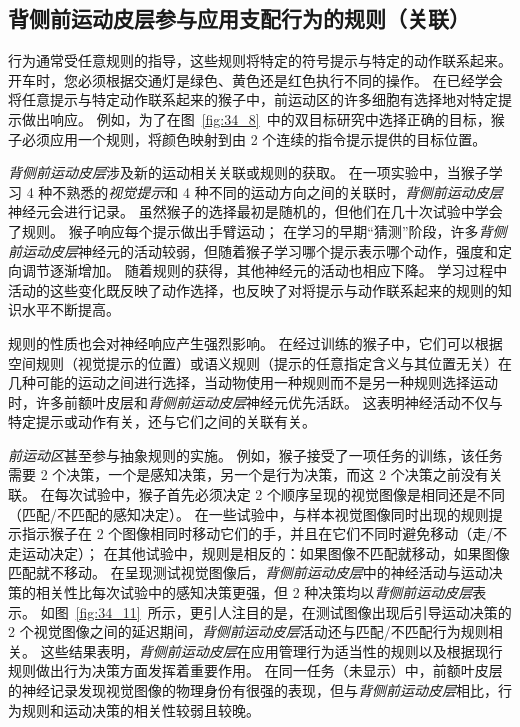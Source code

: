 \subsection{背侧前运动皮层参与应用支配行为的规则（关联）}

行为通常受任意规则的指导，这些规则将特定的符号提示与特定的动作联系起来。
开车时，您必须根据交通灯是绿色、黄色还是红色执行不同的操作。
在已经学会将任意提示与特定动作联系起来的猴子中，前运动区的许多细胞有选择地对特定提示做出响应。
例如，为了在图~\ref{fig:34_8}~中的双目标研究中选择正确的目标，猴子必须应用一个规则，将颜色映射到由 2 个连续的指令提示提供的目标位置。


\textit{背侧前运动皮层}涉及新的运动相关关联或规则的获取。
在一项实验中，当猴子学习 4 种不熟悉的\textit{视觉提示}和 4 种不同的运动方向之间的关联时，\textit{背侧前运动皮层}神经元会进行记录。
虽然猴子的选择最初是随机的，但他们在几十次试验中学会了规则。
猴子响应每个提示做出手臂运动；
在学习的早期“猜测”阶段，许多\textit{背侧前运动皮层}神经元的活动较弱，但随着猴子学习哪个提示表示哪个动作，强度和定向调节逐渐增加。
随着规则的获得，其他神经元的活动也相应下降。
学习过程中活动的这些变化既反映了动作选择，也反映了对将提示与动作联系起来的规则的知识水平不断提高。


规则的性质也会对神经响应产生强烈影响。
在经过训练的猴子中，它们可以根据空间规则（视觉提示的位置）或语义规则（提示的任意指定含义与其位置无关）在几种可能的运动之间进行选择，当动物使用一种规则而不是另一种规则选择运动时，许多前额叶皮层和\textit{背侧前运动皮层}神经元优先活跃。
这表明神经活动不仅与特定提示或动作有关，还与它们之间的关联有关。


\textit{前运动区}甚至参与抽象规则的实施。
例如，猴子接受了一项任务的训练，该任务需要 2 个决策，一个是感知决策，另一个是行为决策，而这 2 个决策之前没有关联。
在每次试验中，猴子首先必须决定 2 个顺序呈现的视觉图像是相同还是不同（匹配/不匹配的感知决定）。
在一些试验中，与样本视觉图像同时出现的规则提示指示猴子在 2 个图像相同时移动它们的手，并且在它们不同时避免移动（走/不走运动决定）；
在其他试验中，规则是相反的：如果图像不匹配就移动，如果图像匹配就不移动。
在呈现测试视觉图像后，\textit{背侧前运动皮层}中的神经活动与运动决策的相关性比每次试验中的感知决策更强，但 2 种决策均以\textit{背侧前运动皮层}表示。
如图~\ref{fig:34_11}~所示，更引人注目的是，在测试图像出现后引导运动决策的 2 个视觉图像之间的延迟期间，\textit{背侧前运动皮层}活动还与匹配/不匹配行为规则相关。
这些结果表明，\textit{背侧前运动皮层}在应用管理行为适当性的规则以及根据现行规则做出行为决策方面发挥着重要作用。
在同一任务（未显示）中，前额叶皮层的神经记录发现视觉图像的物理身份有很强的表现，但与\textit{背侧前运动皮层}相比，行为规则和运动决策的相关性较弱且较晚。


